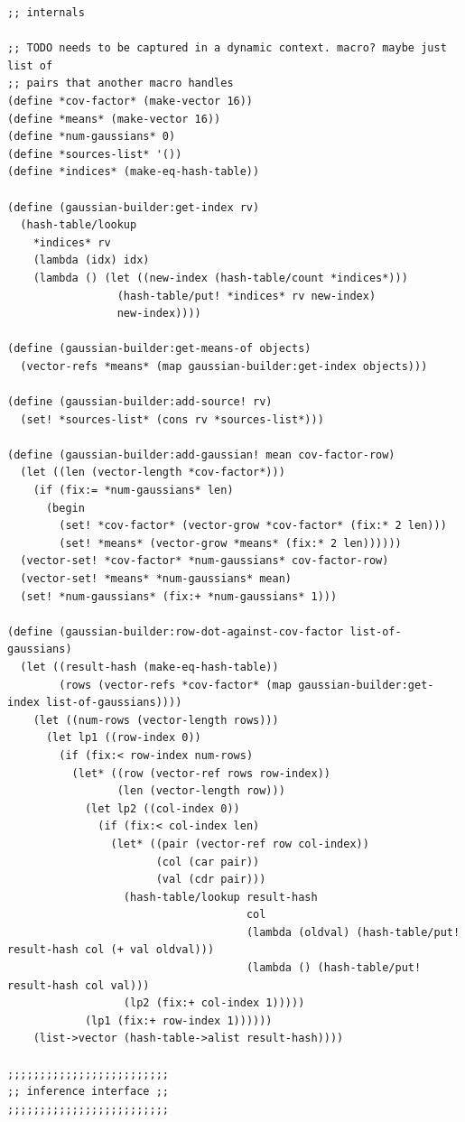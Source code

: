 \documentclass{article}
\begin{document}
\begin{verbatim}
;; internals

;; TODO needs to be captured in a dynamic context. macro? maybe just list of
;; pairs that another macro handles
(define *cov-factor* (make-vector 16))
(define *means* (make-vector 16))
(define *num-gaussians* 0)
(define *sources-list* '())
(define *indices* (make-eq-hash-table))

(define (gaussian-builder:get-index rv)
  (hash-table/lookup
    *indices* rv
    (lambda (idx) idx)
    (lambda () (let ((new-index (hash-table/count *indices*)))
                 (hash-table/put! *indices* rv new-index)
                 new-index))))

(define (gaussian-builder:get-means-of objects)
  (vector-refs *means* (map gaussian-builder:get-index objects)))

(define (gaussian-builder:add-source! rv)
  (set! *sources-list* (cons rv *sources-list*)))

(define (gaussian-builder:add-gaussian! mean cov-factor-row)
  (let ((len (vector-length *cov-factor*)))
    (if (fix:= *num-gaussians* len)
      (begin
        (set! *cov-factor* (vector-grow *cov-factor* (fix:* 2 len)))
        (set! *means* (vector-grow *means* (fix:* 2 len))))))
  (vector-set! *cov-factor* *num-gaussians* cov-factor-row)
  (vector-set! *means* *num-gaussians* mean)
  (set! *num-gaussians* (fix:+ *num-gaussians* 1)))

(define (gaussian-builder:row-dot-against-cov-factor list-of-gaussians)
  (let ((result-hash (make-eq-hash-table))
        (rows (vector-refs *cov-factor* (map gaussian-builder:get-index list-of-gaussians))))
    (let ((num-rows (vector-length rows)))
      (let lp1 ((row-index 0))
        (if (fix:< row-index num-rows)
          (let* ((row (vector-ref rows row-index))
                 (len (vector-length row)))
            (let lp2 ((col-index 0))
              (if (fix:< col-index len)
                (let* ((pair (vector-ref row col-index))
                       (col (car pair))
                       (val (cdr pair)))
                  (hash-table/lookup result-hash
                                     col
                                     (lambda (oldval) (hash-table/put! result-hash col (+ val oldval)))
                                     (lambda () (hash-table/put! result-hash col val)))
                  (lp2 (fix:+ col-index 1)))))
            (lp1 (fix:+ row-index 1))))))
    (list->vector (hash-table->alist result-hash))))

;;;;;;;;;;;;;;;;;;;;;;;;;
;; inference interface ;;
;;;;;;;;;;;;;;;;;;;;;;;;;


\end{verbatim}
\end{document}
